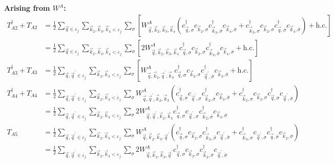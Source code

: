 \documentclass{revtex4-2}
\begin{document}
{\bf Arising from \(W^A\):}
\begin{equation}\begin{aligned}
	T_{A2}^\dagger + T_{A2} &= \frac{1}{2}\sum_{\vec q \in \varepsilon_j}\sum_{\vec k_2, \vec k_3, \vec k_4 < \varepsilon_j}\sum_{\sigma} \left[W^A_{\vec q,\vec k_2,\vec k_3,\vec k_4}\left(c^\dagger_{\vec q,\sigma}c_{\vec k_2,\sigma}c^\dagger_{\vec k_3,\bar\sigma}c_{\vec k_4,\bar\sigma} + c^\dagger_{\vec k_3,\sigma}c_{\vec k_2,\sigma}c^\dagger_{\vec q,\bar\sigma}c_{\vec k_4,\bar\sigma}\right) + \text{h.c.}\right]\\
				&= \frac{1}{2}\sum_{\vec q \in \varepsilon_j}\sum_{\vec k_2, \vec k_3, \vec k_4 < \varepsilon_j}\sum_{\sigma} \left[2W^A_{\vec q,\vec k_2,\vec k_3,\vec k_4}c^\dagger_{\vec q,\sigma}c_{\vec k_2,\sigma}c^\dagger_{\vec k_3,\bar\sigma}c_{\vec k_4,\bar\sigma} + \text{h.c.}\right]\\
	T_{A3}^\dagger + T_{A3} &= \frac{1}{2}\sum_{\vec q, \vec q^\prime \in \varepsilon_j}\sum_{\vec k_2, \vec k_3 < \varepsilon_j}\sum_{\sigma} \left[W^A_{\vec q,\vec k_2, \vec q^\prime, \vec k_3}c^\dagger_{\vec q,\sigma}c_{\vec k_2,\sigma}c^\dagger_{\vec q^\prime,\bar\sigma}c_{\vec k_3,\bar\sigma} + \text{h.c.}\right]\\
	T_{A4}^\dagger + T_{A4} &= \frac{1}{2}\sum_{\vec q, \vec q^\prime \in \varepsilon_j}\sum_{\vec k_2, \vec k_3 < \varepsilon_j}\sum_{\sigma}W^A_{\vec q,\vec q^\prime,\vec k_2,\vec k_3} \left(c^\dagger_{\vec q,\sigma}c_{\vec q^\prime,\sigma}c^\dagger_{\vec k_2,\bar\sigma}c_{\vec k_3,\bar\sigma} + c^\dagger_{\vec k_2,\sigma}c_{\vec k_3,\sigma}c^\dagger_{\vec q,\bar\sigma}c_{\vec q^\prime,\bar\sigma}\right)\\
				&= \frac{1}{2}\sum_{\vec q, \vec q^\prime \in \varepsilon_j}\sum_{\vec k_2, \vec k_3 < \varepsilon_j}\sum_{\sigma}2W^A_{\vec q,\vec q^\prime,\vec k_2,\vec k_3} c^\dagger_{\vec q,\sigma}c_{\vec q^\prime,\sigma}c^\dagger_{\vec k_2,\bar\sigma}c_{\vec k_3,\bar\sigma}\\
	T_{A5} &= \frac{1}{2}\sum_{\vec q, \vec q^\prime \in \varepsilon_j}\sum_{\vec k_2, \vec k_3 < \varepsilon_j}\sum_{\sigma}W^A_{\vec q,\vec k_2,\vec k_3,\vec q^\prime} \left(c^\dagger_{\vec q,\sigma}c_{\vec k_2,\sigma}c^\dagger_{\vec k_3,\bar\sigma}c_{\vec q^\prime,\bar\sigma} + c^\dagger_{\vec k_3,\sigma}c_{\vec q^\prime,\sigma}c^\dagger_{\vec q,\bar\sigma}c_{\vec k_2,\bar\sigma}\right) \\
	       &= \frac{1}{2}\sum_{\vec q, \vec q^\prime \in \varepsilon_j}\sum_{\vec k_2, \vec k_3 < \varepsilon_j}\sum_{\sigma}2W^A_{\vec q,\vec k_2,\vec k_3,\vec q^\prime} c^\dagger_{\vec q,\sigma}c_{\vec k_2,\sigma}c^\dagger_{\vec k_3,\bar\sigma}c_{\vec q^\prime,\bar\sigma} \\

\end{aligned}
\end{equation}
\end{document}
